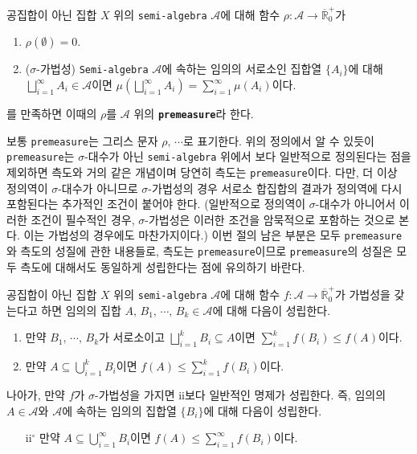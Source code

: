 \begin{definition}
     공집합이 아닌 집합 $X$ 위의 \texttt{semi-algebra} $\mathcal{A}$에 대해 함수 $\rho:\mathcal{A}\to\overline{\mathbb{R}}^+_0$가
     \begin{enumerate}
        \item $\rho(\emptyset)=0$.
        \item ($\sigma$-가법성) \texttt{Semi-algebra} $\mathcal{A}$에 속하는 임의의 서로소인 집합열 $\{A_i\}$에 대해 $\bigsqcup_{i=1}^\infty A_i\in\mathcal{A}$이면 $\mu(\bigsqcup_{i=1}^\infty A_i)=\sum_{i=1}^\infty\mu(A_i)$이다.
     \end{enumerate}
     를 만족하면 이때의 $\rho$를 $\mathcal{A}$ 위의 \textbf{\texttt{premeasure}}라 한다.
\end{definition}

보통 \texttt{premeasure}는 그리스 문자 $\rho,\,\cdots$로 표기한다. 위의 정의에서 알 수 있듯이 \texttt{premeasure}는 $\sigma$-대수가 아닌 \texttt{semi-algebra} 위에서 보다 일반적으로 정의된다는 점을 제외하면 측도와 거의 같은 개념이며 당연히 측도는 \texttt{premeasure}이다. 다만, 더 이상 정의역이 $\sigma$-대수가 아니므로 $\sigma$-가법성의 경우 서로소 합집합의 결과가 정의역에 다시 포함된다는 추가적인 조건이 붙어야 한다. (일반적으로 정의역이 $ \sigma$-대수가 아니어서 이러한 조건이 필수적인 경우, $\sigma$-가법성은 이러한 조건을 암묵적으로 포함하는 것으로 본다. 이는 가법성의 경우에도 마찬가지이다.) 이번 절의 남은 부분은 모두 \texttt{premeasure}와 측도의 성질에 관한 내용들로, 측도는 \texttt{premeasure}이므로 \texttt{premeasure}의 성질은 모두 측도에 대해서도 동일하게 성립한다는 점에 유의하기 바란다.

\begin{lemma}\label{lem:premeasure}
    공집합이 아닌 집합 $X$ 위의 \texttt{semi-algebra} $\mathcal{A}$에 대해 함수 $f:\mathcal{A}\to\overline{\mathbb{R}}^+_0$가 가법성을 갖는다고 하면 임의의 집합 $A,\,B_1,\,\cdots,\,B_k\in\mathcal{A}$에 대해 다음이 성립한다.
    \begin{enumerate}
        \item 만약 $B_1,\,\cdots,\,B_k$가 서로소이고 $\bigsqcup_{i=1}^kB_i\subseteq A$이면 $\sum_{i=1}^kf(B_i)\leq f(A)$이다.
        \item 만약 $A\subseteq\bigcup_{i=1}^kB_i$이면 $f(A)\leq\sum_{i=1}^kf(B_i)$이다.
    \end{enumerate}
    나아가, 만약 $f$가 $\sigma$-가법성을 가지면 ii보다 일반적인 명제가 성립한다. 즉, 임의의 $A\in\mathcal{A}$와 $\mathcal{A}$에 속하는 임의의 집합열 $\{B_i\}$에 대해 다음이 성립한다.
    \begin{enumerate}
        \item[ii$^\circ$] 만약 $A\subseteq\bigcup_{i=1}^\infty B_i$이면 $f(A)\leq\sum_{i=1}^\infty f(B_i)$이다.
    \end{enumerate}
\end{lemma}

